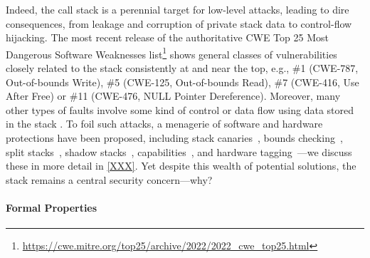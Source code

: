 Indeed, the call stack is a perennial target for low-level attacks, leading to
dire consequences, from leakage and corruption of private stack data
to control-flow hijacking.
%
The most recent release of the authoritative CWE Top 25
Most Dangerous Software Weaknesses
list\footnote{\url{https://cwe.mitre.org/top25/archive/2022/2022_cwe_top25.html}}
shows general classes of vulnerabilities closely related to the stack 
consistently at and near the top, e.g., \#1 (CWE-787, Out-of-bounds Write), \#5 (CWE-125, Out-of-bounds Read), \#7 (CWE-416, Use After Free) or \#11 (CWE-476, NULL Pointer Dereference).
%
Moreover, many other types of faults involve some kind of control or data flow
using data stored in the stack .
%
To foil such attacks, a menagerie of
software and hardware protections have been proposed,
%
including stack canaries~\cite{Cowan+98},
bounds checking~\cite{NagarakatteZMZ09,NagarakatteZMZ10,DeviettiBMZ08},
split stacks~\cite{Kuznetsov+14},
shadow stacks~\cite{Dang+15,Shanbhogue+19},
capabilities~\cite{Woodruff+14,Chisnall+15,SkorstengaardLocal,SkorstengaardSTKJFP,Georges+21},
and hardware tagging~\cite{DBLP:conf/sp/RoesslerD18}---we discuss these in more
detail in \cref{XXX}.
  \ifaftersubmission{}
\fi
%
%
Yet despite this wealth of potential solutions, the stack remains a central
security concern---why?

\paragraph{Formal Properties}

